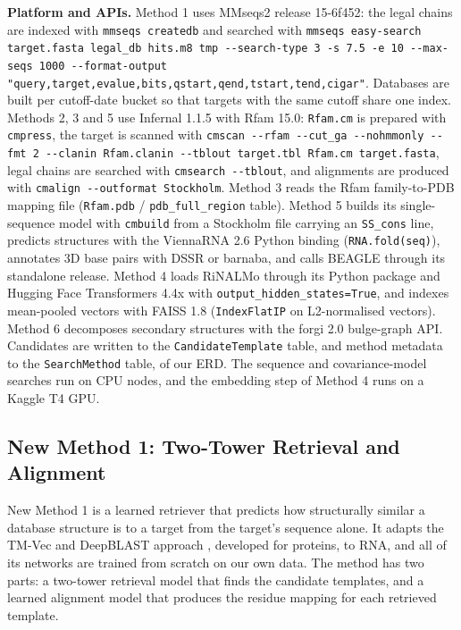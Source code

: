 \documentclass{FastFyp}
\begin{document}
\textbf{Platform and APIs.} Method 1 uses MMseqs2 release 15-6f452: the legal chains are indexed with \texttt{mmseqs createdb} and searched with \texttt{mmseqs easy-search target.fasta legal\_db hits.m8 tmp -{}-search-type 3 -s 7.5 -e 10 -{}-max-seqs 1000 -{}-format-output "query,target,evalue,bits,qstart,qend,tstart,tend,cigar"}. Databases are built per cutoff-date bucket so that targets with the same cutoff share one index. Methods 2, 3 and 5 use Infernal 1.1.5 with Rfam 15.0: \texttt{Rfam.cm} is prepared with \texttt{cmpress}, the target is scanned with \texttt{cmscan -{}-rfam -{}-cut\_ga -{}-nohmmonly -{}-fmt 2 -{}-clanin Rfam.clanin -{}-tblout target.tbl Rfam.cm target.fasta}, legal chains are searched with \texttt{cmsearch -{}-tblout}, and alignments are produced with \texttt{cmalign -{}-outformat Stockholm}. Method 3 reads the Rfam family-to-PDB mapping file (\texttt{Rfam.pdb} / \texttt{pdb\_full\_region} table). Method 5 builds its single-sequence model with \texttt{cmbuild} from a Stockholm file carrying an \texttt{SS\_cons} line, predicts structures with the ViennaRNA 2.6 Python binding (\texttt{RNA.fold(seq)}), annotates 3D base pairs with DSSR or barnaba, and calls BEAGLE through its standalone release. Method 4 loads RiNALMo through its Python package and Hugging Face Transformers 4.4x with \texttt{output\_hidden\_states=True}, and indexes mean-pooled vectors with FAISS 1.8 (\texttt{IndexFlatIP} on L2-normalised vectors). Method 6 decomposes secondary structures with the forgi 2.0 bulge-graph API. Candidates are written to the \texttt{CandidateTemplate} table, and method metadata to the \texttt{SearchMethod} table, of our ERD. The sequence and covariance-model searches run on CPU nodes, and the embedding step of Method 4 runs on a Kaggle T4 GPU.

\subsection{New Method 1: Two-Tower Retrieval and Alignment}
\label{sec:impl-nm1}
New Method 1 is a learned retriever that predicts how structurally similar a database structure is to a target from the target's sequence alone. It adapts the TM-Vec and DeepBLAST approach \cite{hamamsy2024}, developed for proteins, to RNA, and all of its networks are trained from scratch on our own data. The method has two parts: a two-tower retrieval model that finds the candidate templates, and a learned alignment model that produces the residue mapping for each retrieved template.
\end{document}

